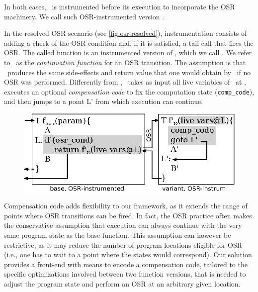 \noindent In both cases, \fbase\ is instrumented before its execution to incorporate the OSR machinery. We call such OSR-instrumented version \fosrfrom.

In the resolved OSR scenario (see \myfigure\ref{fig:osr-resolved}), instrumentation consists of adding a check of the OSR condition and, if it is satisfied, a tail call that fires the OSR. The called function is an instrumented version of \fvariant, which we call \fosrto. We refer to \fosrto\ as the {\em continuation function} for an OSR transition. The assumption is that \fosrto\ produces the same side-effects and return value that one would obtain by \fbase\ if no OSR was performed. Differently from \fvariant, \fosrto\ takes as input all live variables of \fbase\ at \osrpoint, executes an optional {\em compensation code} to fix the computation state ({\tt comp\_code}), and then jumps to a point \textsf{L'} from which execution can continue.

\ifdefined\noauthorea
\begin{figure}[b]
\begin{center}
\includegraphics[width=0.7\columnwidth]{figures/osr-resolved/osr-resolved.eps}
\caption{\protect}
\end{center}
\end{figure}
\fi

Compensation code adds flexibility to our framework, as it extends the range of points where OSR transitions can be fired. In fact, the OSR practice often makes the conservative assumption that execution can always continue with the very same program state as the base function. This assumption can however be restrictive, as it may reduce the number of program locations eligible for OSR (i.e., one has to wait to a point where the states would correspond). Our solution provides a front-end with means to encode a compensation code, tailored to the specific optimizations involved between two function versions, that is needed to adjust the program state and perform an OSR at an arbitrary given location.